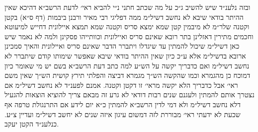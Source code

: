 \documentclass[12pt, openany]{book}
\begin{document}
\begin{multicols}{2}
ובזה נלענ״ד שיש להשיב ג״כ על מה שכתב חתני נ״י להביא ראי׳ לדעת הרשב״א דהיכא שאין ההיתר בודאי שיבא לא נחשב דשיל״מ ממה דפליגי רבי מאיר ורבנן ביבמות (דף ס״א) בקטן וקטנה שלר״מ לא מיבמין קטן שמא ימצא סריס וקטנה שמא תמצא איילונית דחייש למיעוטא וחכמים מתירין דאזלינן בתר רובא שאינם סריס ואיילונית וכוותייהו פסקינן ולמה לא נאמר שיש כאן דשיל״מ שיכול להמתין עד שיגדלו ויתברר הדבר שאינם סריס ואיילונית והאיך סמכינן ארובא בדשיל״מ אלא ע״כ כיון שאין ההיתר בודאי שיבא שאפשר שימותו קודם שיתברר לא נחשב דשיל״מ ואם כדבריך יקשה על הש״ע למה כתב דעת הרשב״א בשם יש מי שאומר כיון דמוכח כן מהגמרא וכמו שהקשה הש״ך מגמרא דביצה והפלתי תירץ קושית הש״ך שאין משם ראי׳ אבל כדבריך הלא יקשה מראי׳ זו דקטן וקטנה. אמנם לפענ״ד לא נחשב דשיל״מ אם נצטרך אותם להמתין ולעגנם שנים רבות דודאי לא גרע זה מבאם צריך להוציא הוצאות להגעיל דלא נחשב דשיל״מ ולא דמי לדין הרשב״א להמתין כ״א יום לידע אם התרנגולת טרפה אף שכעת לא ידעתי ראי׳ מבוררת לזה דמשום עיגון איזה שנים לא יחשב דשיל״מ ועדיין צ״ע. כנלענ״ד הקטן יעקב.\\\vspace{0pt}

\end{multicols}\newpage
\end{document}
